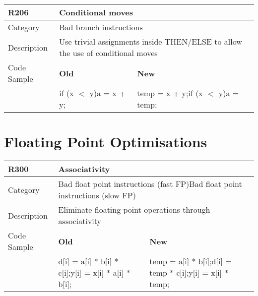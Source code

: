 \begin{tabular}{|p{0.9in}|p{2.0in}|p{2.0in}|} \hline
\textbf{R206}       & \multicolumn{2}{|p{4.0in}|}{\textbf{Conditional moves}} \\ \hline
Category            & \multicolumn{2}{|p{4.0in}|}{Bad branch instructions} \\ \hline
Description         & \multicolumn{2}{|p{4.0in}|}{Use trivial assignments inside THEN/ELSE to allow the use of conditional moves} \\ \hline
Code Sample         & \textbf{Old} & \textbf{New} \\ \hline
                    & if (x $<$ y)\newline   a = x + y;
                    & temp = x + y;\newline if (x $<$ y)\newline   a = temp;  \\ \hline
\end{tabular}

\section{Floating Point Optimisations}
\label{sec:Floating_Point_Optimizations}

\begin{tabular}{|p{0.9in}|p{2.0in}|p{2.0in}|} \hline
\textbf{R300}       & \multicolumn{2}{|p{4.0in}|}{\textbf{Associativity}} \\ \hline
Category            & \multicolumn{2}{|p{4.0in}|}{Bad float point instructions (fast FP)\newline Bad float point instructions (slow FP)} \\ \hline
Description         & \multicolumn{2}{|p{4.0in}|}{Eliminate floating-point operations through associativity} \\ \hline
Code Sample         & \textbf{Old} & \textbf{New} \\ \hline
                    & d[i] = a[i] * b[i] * c[i];\newline y[i] = x[i] * a[i] * b[i];
                    & temp = a[i] * b[i];\newline d[i] = temp * c[i];\newline y[i] = x[i] * temp;  \\ \hline
\end{tabular}

